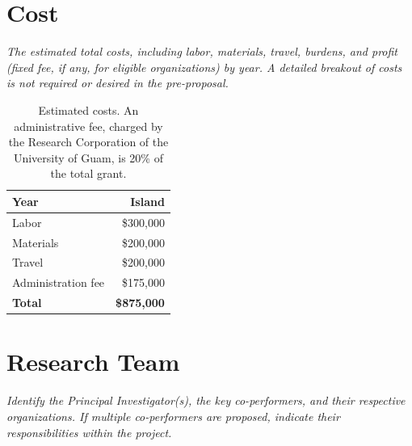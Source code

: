 \documentclass[11pt,english,letterpaper]{scrartcl}
\begin{document}

\clearpage
\section{Cost}

\textit{The estimated total costs, including labor, materials, travel, burdens, and profit	(fixed fee, if any, for eligible organizations) by year. A detailed breakout of costs is not	required or desired in the pre-proposal.}\\

\begin{table}[H]
	\centering
	\caption{Estimated costs. An administrative fee, charged by the Research Corporation of the University of Guam, is 20\% of the total grant.}	
	
	\begin{tabular}{lr}
		\toprule
		\textbf{Year} & \textbf{Island} \\ \midrule
		Labor & \$300,000 \\			
		Materials & \$200,000 \\
		Travel & \$200,000 \\
		Administration fee & \$175,000 \\	\midrule
		\textbf{Total} & \textbf{\$875,000}
	\end{tabular}
	\label{tbl:north}	
\end{table}

\section{Research Team}

\textit{Identify the Principal Investigator(s), the key co-performers, and their respective organizations. If multiple co-performers are proposed, indicate their responsibilities within the project.}\\
\end{document}
